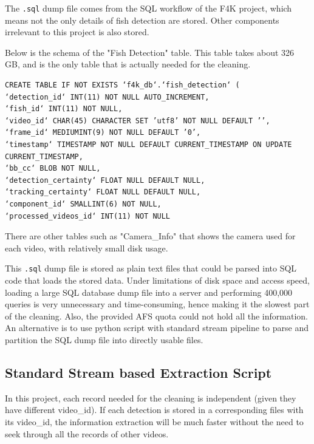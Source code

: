 \documentclass[bsc,logo,twoside,fullspacing,parskip]{infthesis}
\begin{document}
The {\tt .sql} dump file comes from the SQL workflow of the F4K project, which means not the only details of fish detection are stored. 
Other components irrelevant to this project is also stored. 

Below is the schema of the "Fish Detection" table. 
This table takes about 326 GB, and is the only table that is actually needed for the cleaning.

\lstset{basicstyle=\tiny\ttfamily,breaklines=true,style=sql}
\begin{lstlisting}[frame=single]
CREATE TABLE IF NOT EXISTS ‘f4k_db‘.‘fish_detection‘ (
‘detection_id‘ INT(11) NOT NULL AUTO_INCREMENT,
‘fish_id‘ INT(11) NOT NULL,
‘video_id‘ CHAR(45) CHARACTER SET ’utf8’ NOT NULL DEFAULT ’’,
‘frame_id‘ MEDIUMINT(9) NOT NULL DEFAULT ’0’,
‘timestamp‘ TIMESTAMP NOT NULL DEFAULT CURRENT_TIMESTAMP ON UPDATE CURRENT_TIMESTAMP,
‘bb_cc‘ BLOB NOT NULL,
‘detection_certainty‘ FLOAT NULL DEFAULT NULL,
‘tracking_certainty‘ FLOAT NULL DEFAULT NULL,
‘component_id‘ SMALLINT(6) NOT NULL,
‘processed_videos_id‘ INT(11) NOT NULL
\end{lstlisting}

There are other tables such as "Camera\_Info" that shows the camera used for each video, with relatively small disk usage.

This {\tt .sql} dump file is stored as plain text files that could be parsed into SQL code that loads the stored data.
Under limitations of disk space and access speed, loading a large SQL database dump file into a server and performing 400,000 queries is very unnecessary and time-consuming, hence making it the slowest part of the cleaning. Also, the provided AFS quota could not hold all the information. 
An alternative is to use python script with standard stream pipeline to parse and partition the SQL dump file into directly usable files.

\subsection{Standard Stream based Extraction Script}

In this project, each record needed for the cleaning is independent (given they have different video\_id). 
If each detection is stored in a corresponding files with its video\_id, the information extraction will be much faster without the need to seek through all the records of other videos.
\end{document}
